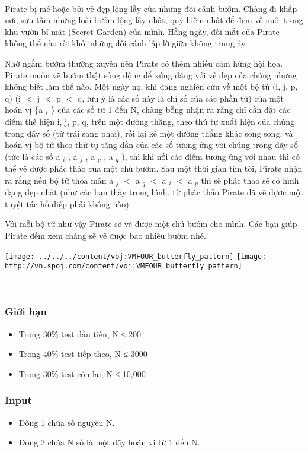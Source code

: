 

 

Pirate bị mê hoặc bởi vẻ đẹp lộng lẫy của những đôi cánh bướm. Chàng đi khắp nơi, sưu tầm những loài bướm lộng lẫy nhất, quý hiếm nhất để đem về nuôi trong khu vườn bí mật (Secret Garden) của mình. Hằng ngày, đôi mắt của Pirate không thể nào rời khỏi những đôi cánh lập lờ giữa không trung ấy.

Nhờ ngắm bướm thường xuyên nên Pirate có thêm nhiều cảm hứng hội họa. Pirate muốn vẽ bướm thật sống động để xứng đáng với vẻ đẹp của chúng nhưng không biết làm thế nào. Một ngày nọ, khi đang nghiên cứu về một bộ tứ (i, j, p, q) (i $<$ j $<$ p $<$ q, lưu ý là các số này là chỉ số của các phần tử) của một hoán vị \{a $_ i $ \} của các số từ 1 đến N, chàng bỗng nhận ra rằng chỉ cần đặt các điểm thể hiện i, j, p, q, trên một đường thẳng, theo thứ tự xuất hiện của chúng trong dãy số (từ trái sang phải), rồi lại kẻ một đường thẳng khác song song, và hoán vị bộ tứ theo thứ tự tăng dần của các số tương ứng với chúng trong dãy số (tức là các số a $_ i $ , a $_ j $ , a $_ p $ , a $_ q $ ), thì khi nối các điểm tương ứng với nhau thì có thể vẽ được phác thảo của một chú bướm. Sau một thời gian tìm tòi, Pirate nhận ra rằng nếu bộ tứ thỏa mãn a $_ j $ $<$ a $_ q $ $<$ a $_ i $ $<$ a $_ p $ thì sẽ phác thảo sẽ có hình dạng đẹp nhất (như các bạn thấy trong hình, từ phác thảo Pirate đã vẽ đựơc một tuyệt tác hồ điệp phải không nào).

Với mỗi bộ tứ như vậy Pirate sẽ vẽ được một chú bướm cho mình. Các bạn giúp Pirate đếm xem chàng sẽ vẽ được bao nhiêu bướm nhé.


\texttt{[image: ../../../content/voj:VMFOUR\_butterfly\_pattern]}
\texttt{[image: http://vn.spoj.com/content/voj:VMFOUR\_butterfly\_pattern]}
\begin{itemize}
\end{itemize}

 

\subsubsection{Giới hạn}
\begin{itemize}
	\item Trong 30\% test đầu tiên, N ≤ 200
	\item Trong 40\% test tiếp theo, N ≤ 3000
	\item Trong 30\% test còn lại, N ≤ 10,000
\end{itemize}

\subsubsection{Input}
\begin{itemize}
	\item Dòng 1 chứa số nguyên N.
	\item Dòng 2 chứa N số là một dãy hoán vị từ 1 đến N.
\end{itemize}

